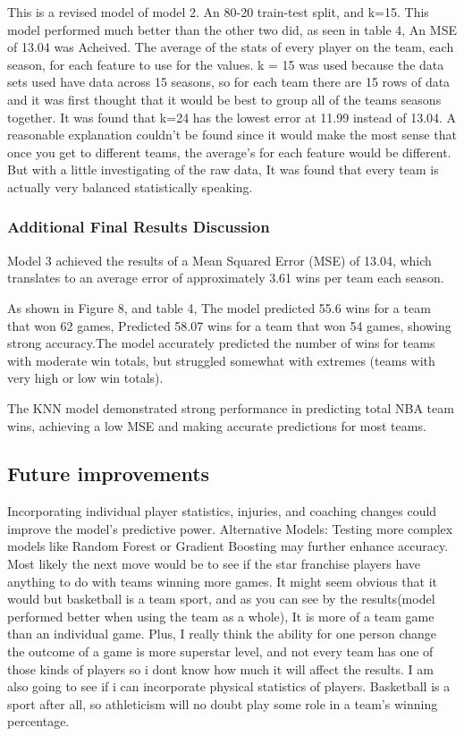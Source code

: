 \documentclass[11pt]{article}
\begin{document}
    This is a revised model of model 2. An 80-20 train-test split, and k=15. This model performed much better than the other two did, as seen in table 4, An MSE of 13.04 was Acheived. The average of the stats of every player on the team, each season, for each feature to use for the
values. k = 15 was used because the data sets used have data across 15
seasons, so for each team there are 15 rows of data and it was first thought that it
would be best to group all of the teams seasons together. It was found that k=24 has the lowest error at 11.99 instead of 13.04. A reasonable explanation couldn't be found
since it would make the most sense that once you get to
different teams, the average's for each feature would be different. But
with a little investigating of the raw data, It was found that every team is actually very
balanced statistically speaking.


\subsubsection{Additional Final Results Discussion}
 Model 3 achieved the results of a Mean Squared Error (MSE) of 13.04, which translates to an average error of approximately 3.61 wins per team each season. 
\medskip
 
As shown in Figure 8, and table 4, The model predicted 55.6
wins for a team that won 62 games, Predicted 58.07 wins for a team that
won 54 games, showing strong accuracy.The model accurately predicted the number 
of wins for teams with moderate win totals, but struggled somewhat with 
extremes (teams with very high or low win totals).

The KNN model demonstrated strong performance in predicting total NBA
team wins, achieving a low MSE and making accurate predictions for most
teams. 

\subsection{Future improvements}
 Incorporating individual player statistics,
injuries, and coaching changes could improve the model's predictive
power. Alternative Models: Testing more complex models like Random
Forest or Gradient Boosting may further enhance accuracy. Most likely the next move would be to see if the star
franchise players have anything to do with teams winning more games. It might seem obvious
that it would but basketball is a team sport, and as you can see by the
results(model performed better when using the team as a whole), It is more of a team game than an individual game. Plus, I really
think the ability for one person change the outcome of a game is more
superstar level, and not every team has one of those kinds of players so i dont know how
much it will affect the results. I am also going to see if i can
incorporate physical statistics of players. Basketball is a sport after all, so
athleticism will no doubt play some role in a team's winning percentage.
\end{document}
